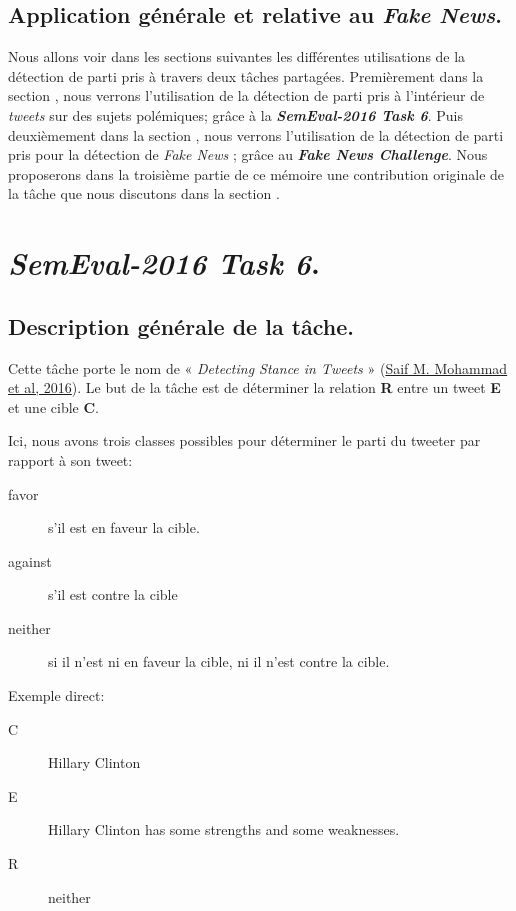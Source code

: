 \documentclass[11pt,a4paper,oldfontcommands]{memoir}
\begin{document}
\subsection{Application générale et relative au \textit{Fake News}.}
Nous allons voir dans les sections suivantes les différentes utilisations de la détection de parti pris à travers deux tâches partagées.
Premièrement dans la section , nous verrons l'utilisation de la détection de parti pris à l'intérieur de \textit{tweets} sur des sujets polémiques; grâce à la \textbf{\textit{SemEval-2016 Task 6}}.
Puis deuxièmement dans la section , nous verrons l'utilisation de la détection de parti pris pour la détection de \textit{Fake News} ; grâce au \textbf{\textit{Fake News Challenge}}.
Nous proposerons dans la troisième partie de ce mémoire une contribution originale de la tâche que nous discutons dans la section .




\section{\textit{SemEval-2016 Task 6}.}
\subsection{Description générale de la tâche.}
Cette tâche porte le nom de « \textit{Detecting Stance in Tweets} » (\href{https://www.aclweb.org/anthology/S/S16/S16-1003.pdf}{Saif M.
 Mohammad et al, 2016}).
Le but de la tâche est de déterminer la relation \textbf{R} entre un tweet \textbf{E} et une cible \textbf{C}.

Ici, nous avons trois classes possibles pour déterminer le parti du tweeter par rapport à son tweet:
\begin{description}
 \item [favor] s'il est en faveur la cible.
 \item [against] s'il est contre la cible
 \item [neither] si il n'est ni en faveur la cible, ni il n'est contre la cible.
\end{description}

Exemple direct:

\begin{description}
 \item [C] Hillary Clinton
 \item [E] Hillary Clinton has some strengths and some weaknesses.
 \item [R] neither
\end{description}
\end{document}
